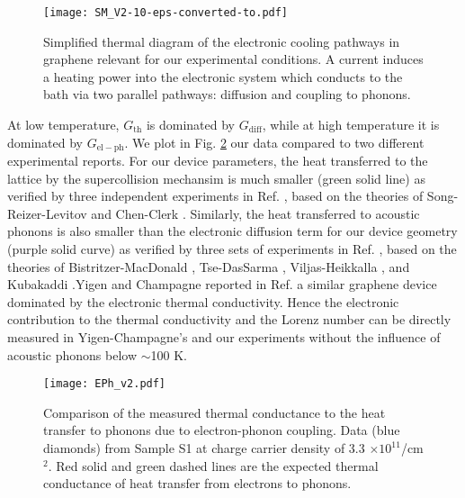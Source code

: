 \documentclass[10pt, oneside]{book}
\begin{document}
\begin{doublespace}
\begin{appendix}
 \begin{figure}
 \centering
\texttt{[image: SM\_V2-10-eps-converted-to.pdf]}
\caption{Simplified thermal diagram of the electronic cooling pathways in graphene relevant for our experimental conditions.  A current induces a heating power into the electronic system which conducts to the bath via two parallel pathways:  diffusion and coupling to phonons.}
\label{figs5}
\end{figure}

At low temperature, $G_{\mathrm{th}}$ is dominated by $G_{\mathrm{diff}}$, while at high temperature it is dominated by $G_{\mathrm{el-ph}}$. We plot in Fig. \ref{figsEPh} our data compared to two different experimental reports. For our device parameters, the heat transferred to the lattice by the supercollision mechansim is much smaller (green solid line) as verified by three independent experiments in Ref. \cite{Graham:2013vl, betz, laitinen}, based on the theories of Song-Reizer-Levitov \cite{Song:2012by} and Chen-Clerk \cite{Chen:2012et}. Similarly, the heat transferred to acoustic phonons is also smaller than the electronic diffusion term for our device geometry (purple solid curve) as verified by three sets of experiments in Ref. \cite{betz}, \cite{fong, fong2, crossno2, prober} based on the theories of Bistritzer-MacDonald \cite{Bistritzer:2009ht}, Tse-DasSarma \cite{Tse:2009il}, Viljas-Heikkalla \cite{Viljas:2010jj}, and Kubakaddi \cite{Kubakaddi:2009br}.Yigen and Champagne reported in Ref. \cite{yigen} a similar graphene device dominated by the electronic thermal conductivity. Hence the electronic contribution to the thermal conductivity and the Lorenz number can be directly measured in Yigen-Champagne's \cite{yigen} and our experiments without the influence of acoustic phonons below $\sim$100 K.

\begin{figure}
\centering
\texttt{[image: EPh\_v2.pdf]}
\caption{Comparison of the measured thermal conductance to the heat transfer to phonons due to electron-phonon coupling. Data (blue diamonds) from Sample S1 at charge carrier density of 3.3 $\times 10^{11}$/cm$^2$. Red solid and green dashed lines are the expected thermal conductance of heat transfer from electrons to phonons.}
\label{figsEPh}
\end{figure}


\end{appendix}
\end{doublespace}
\end{document}
